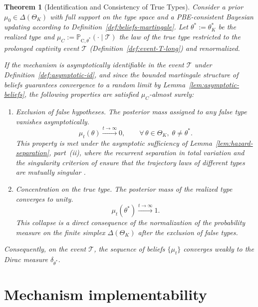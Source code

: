 \documentclass[pdflatex,sn-mathphys-ay]{sn-jnl}
\theoremstyle{plain}
\newtheorem{theorem}{Theorem}
\theoremstyle{definition}
\newcommand{\ProbC}[1]{\mathbb{P}_{\mathrm{C},#1}}
\newcommand{\ThetaK}{\Theta_K}
\newcommand{\1}{\mathbf{1}}
\begin{document}
\begin{theorem}[Identification and Consistency of True Types]\label{thm:posterior-consistency}
\normalfont
Consider a prior $\mu_0\in\Delta(\ThetaK)$ with full support on the type space and a PBE-consistent Bayesian updating according to Definition~\ref{def:beliefs-martingale}. Let $\theta^\ast:=\theta_K^\ast$ be the realized type and $\mu_C:=\ProbC{\theta^\ast}(\cdot\mid\mathcal{T})$ the law of the true type restricted to the prolonged captivity event $\mathcal{T}$ \textup{(}Definition~\ref{def:event-T-long}\textup{)} and renormalized.

If the mechanism is asymptotically identifiable in the event $\mathcal{T}$ under Definition~\ref{def:asymptotic-id}, and since the bounded martingale structure of beliefs guarantees convergence to a random limit by Lemma~\ref{lem:asymptotic-beliefs}, the following properties are satisfied $\mu_C$-almost surely:
\begin{enumerate}
  \item Exclusion of false hypotheses. The posterior mass assigned to any false type vanishes asymptotically.
  \begin{equation*}
  \mu_t(\theta)\xrightarrow{t\to\infty}0,\qquad \forall\,\theta\in\ThetaK,\;\theta\neq\theta^\ast.
  \end{equation*}
  This property is met under the asymptotic sufficiency of Lemma~\ref{lem:hazard-separation}, part~\textup{(ii)}, where the recurrent separation in total variation and the singularity criterion of \citet{Kakutani1948} ensure that the trajectory laws of different types are mutually singular \citet{Shiryaev2019Probability}.

  \item Concentration on the true type. The posterior mass of the realized type converges to unity.
  \begin{equation*}
  \mu_t(\theta^\ast)\xrightarrow{t\to\infty}1.
  \end{equation*}
  This collapse is a direct consequence of the normalization of the probability measure on the finite simplex $\Delta(\ThetaK)$ after the exclusion of false types.
\end{enumerate}
Consequently, on the event $\mathcal{T}$, the sequence of beliefs $\{\mu_t\}$ converges weakly to the Dirac measure $\delta_{\theta^\ast}$.
\end{theorem}



\section{Mechanism implementability}\label{sec:implementabilidad}
\end{document}
